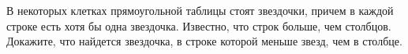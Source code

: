 В некоторых клетках прямоугольной таблицы стоят звездочки, причем в каждой строке есть хотя бы одна
звездочка. Известно, что строк больше, чем столбцов. Докажите, что найдется звездочка, в строке которой
меньше звезд, чем в столбце.
